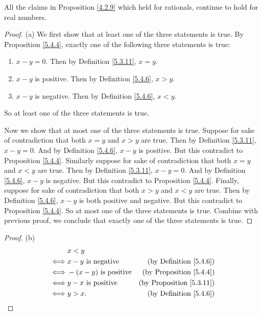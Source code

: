 \begin{proposition}\label{5.4.7}
All the claims in Proposition \ref{4.2.9} which held for rationals, continue to hold for real numbers.
\end{proposition}

\begin{proof}{(a)}
We first show that at least one of the three statements is true.
By Proposition \ref{5.4.4}, exactly one of the following three statements is true:
\begin{enumerate}
    \item \(x - y = 0\).
    Then by Definition \ref{5.3.11}, \(x = y\).
    \item \(x - y\) is positive.
    Then by Definition \ref{5.4.6}, \(x > y\).
    \item \(x - y\) is negative.
    Then by Definition \ref{5.4.6}, \(x < y\).
\end{enumerate}
So at least one of the three statements is true.

Now we show that at most one of the three statements is true.
Suppose for sake of contradiction that both \(x = y\) and \(x > y\) are true.
Then by Definition \ref{5.3.11}, \(x - y = 0\).
And by Definition \ref{5.4.6}, \(x - y\) is positive.
But this contradict to Proposition \ref{5.4.4}.
Similarly suppose for sake of contradiction that both \(x = y\) and \(x < y\) are true.
Then by Definition \ref{5.3.11}, \(x - y = 0\).
And by Definition \ref{5.4.6}, \(x - y\) is negative.
But this contradict to Proposition \ref{5.4.4}.
Finally, suppose for sake of contradiction that both \(x > y\) and \(x < y\) are true.
Then by Definition \ref{5.4.6}, \(x - y\) is both positive and negative.
But this contradict to Proposition \ref{5.4.4}.
So at most one of the three statements is true.
Combine with previous proof, we conclude that exactly one of the three statements is true.
\end{proof}

\begin{proof}{(b)}
\begin{align*}
& x < y \\
\iff & x - y \text{ is negative} & \text{(by Definition \ref{5.4.6})} \\
\iff & -(x - y) \text{ is positive} & \text{(by Proposition \ref{5.4.4})} \\
\iff & y - x \text{ is positive} & \text{(by Proposition \ref{5.3.11})} \\
\iff & y > x. & \text{(by Definition \ref{5.4.6})}
\end{align*}
\end{proof}

